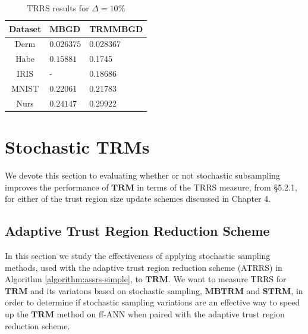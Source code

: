 \documentclass[letterpaper,12pt,titlepage,oneside,final]{book}
\begin{document}
	\begin{table}[h] 
		\centering 
		\begin{tabular}{ |c|l|l| } 
			\hline 
			\textbf{Dataset} & \textbf{MBGD} & \textbf{TRMMBGD}\\ 
			\hline 
			Derm & $\mathbf{0.026375}$ &0.028367\\ 
			\hline 
			Habe & $\mathbf{0.15881}$ &0.1745\\ 
			\hline 
			IRIS & - & $\mathbf{0.18686}$\\ 
			\hline 
			MNIST &0.22061 & $\mathbf{0.21783}$\\ 
			\hline 
			Nurs & $\mathbf{0.24147}$ &0.29922\\ 
			\hline 
		\end{tabular} 
		\caption{TRRS results for $\Delta = 10\%$} \label{TRMMBGD10} \end{table}
	
	\section{Stochastic TRMs}
	
	We devote this section to evaluating whether or not stochastic subsampling improves the performance of $\mathbf{TRM}$ in terms of the TRRS measure, from \S{5.2.1}, for either of the trust region size update schemes discussed in Chapter 4.
	
	\subsection{Adaptive Trust Region Reduction Scheme}
	
	In this section we study the effectiveness of applying stochastic sampling methods, used with the adaptive trust region reduction scheme (ATRRS) in Algorithm \ref{algorithm:assrs-simple}, to $\mathbf{TRM}$. We want to measure TRRS for $\mathbf{TRM}$ and its variatons based on stochastic sampling, $\mathbf{MBTRM}$ and $\mathbf{STRM}$, in order to determine if stochastic sampling variations are an effective way to speed up the $\mathbf{TRM}$ method on ff-ANN when paired with the adaptive trust region reduction scheme. 
\end{document}
